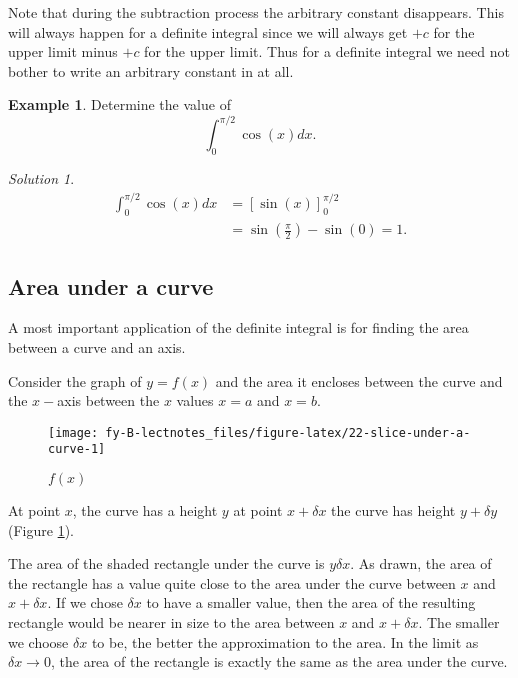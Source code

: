 \documentclass[
  11pt,
  oneside]{book}
\newcommand{\slide}{}
\theoremstyle{definition}
\theoremstyle{definition}
\newtheorem{example}{Example}[chapter]
\theoremstyle{definition}
\theoremstyle{definition}
\theoremstyle{remark}
\newtheorem*{solution}{Solution}
\begin{document}
Note that during the subtraction process the arbitrary constant disappears. This will always happen for a definite integral since we will always get \(+ c\) for the upper limit minus \(+ c\) for the upper limit. Thus for a definite integral we need not bother to write an arbitrary constant in at all.
\slide

\begin{example}
Determine the value of
\[
\int_0^{\pi/2}\cos(x)dx.
\]
\end{example}

\begin{solution}
\begin{align*}
\int_0^{\pi/2}\cos(x)dx& = \left[\sin(x)\right]_0^{\pi/2}\\
&=\sin\left(\frac{\pi}{2}\right)-\sin(0) = 1.
\end{align*}
\end{solution}

\slide

\subsection{Area under a curve}\label{area-under-a-curve}

A most important application of the definite integral is for finding the area between a curve and an axis.

Consider the graph of \(y = f(x)\) and the area it encloses between the curve and the \(x-\)axis between the \(x\) values \(x = a\) and \(x = b\).

\begin{figure}

{\centering \texttt{[image: fy-B-lectnotes\_files/figure-latex/22-slice-under-a-curve-1]} 

}

\caption{$f(x)$}\label{fig:22-slice-under-a-curve}
\end{figure}

At point \(x\), the curve has a height \(y\) at point \(x + \delta x\) the curve has height \(y + \delta y\) (Figure \ref{fig:22-slice-under-a-curve}).

The area of the shaded rectangle under the curve is \(y\delta x\). As drawn, the area of the rectangle has a value quite close to the area under the curve between \(x\) and \(x + \delta x\). If we chose \(\delta x\) to have a smaller value, then the area of the resulting rectangle would be nearer in size to the area between \(x\) and \(x + \delta x\). The smaller we choose \(\delta x\) to be, the better the approximation to the area. In the limit as \(\delta x \to 0\), the area of the rectangle is exactly the same as the area under the curve.
\end{document}
